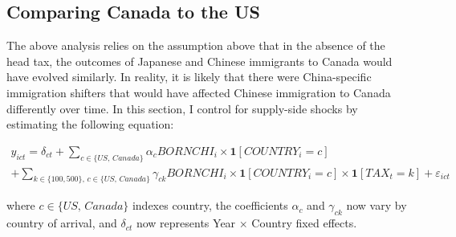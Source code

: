 \documentclass[12pt]{article}
\begin{document}
\subsection{Comparing Canada to the US}
The above analysis relies on the assumption above that in the absence of the head tax, the outcomes of Japanese and Chinese immigrants to Canada would have evolved similarly. In reality, it is likely that there were China-specific immigration shifters that would have affected Chinese immigration to Canada differently over time. In this section, I control for supply-side shocks by estimating the following equation:

\begin{multline}
    \label{eq:uscan}
    y_{ict} = \delta_{ct} + \sum_{c \in \{US, \, Canada\}} \alpha_c BORNCHI_i \times \mathbf{1}[COUNTRY_i = c] \\ + \sum_{k \in \{100,500\}, \, c \in \{US, \, Canada\}} \gamma_{ck} BORNCHI_i \times \mathbf{1}[COUNTRY_i = c] \times \mathbf{1}[TAX_t = k] + \varepsilon_{ict}
\end{multline}

where $c \in \{US, \, Canada\}$ indexes country, the coefficients $\alpha_c$ and $\gamma_{ck}$ now vary by country of arrival, and $\delta_{ct}$ now represents Year $\times$ Country fixed effects. 

\begin{table}[!h]
    \centering 
    \renewcommand{\arraystretch}{1.1}
\end{table}
\end{document}
